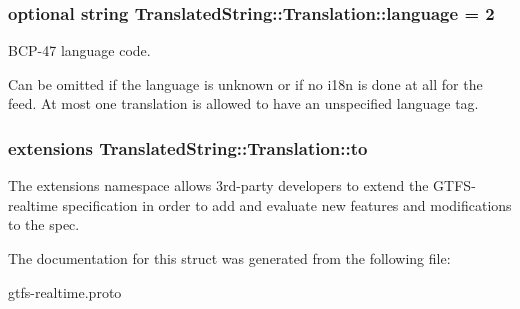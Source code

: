 \subsubsection[{\texorpdfstring{language}{language}}]{\setlength{\rightskip}{0pt plus 5cm}optional string Translated\+String\+::\+Translation\+::language = 2}\hypertarget{structTranslatedString_1_1Translation_a6e5c700cec22dc98de803fb6b645a657}{}\label{structTranslatedString_1_1Translation_a6e5c700cec22dc98de803fb6b645a657}


B\+C\+P-\/47 language code. 

Can be omitted if the language is unknown or if no i18n is done at all for the feed. At most one translation is allowed to have an unspecified language tag. 
\subsubsection[{\texorpdfstring{to}{to}}]{\setlength{\rightskip}{0pt plus 5cm}extensions Translated\+String\+::\+Translation\+::to}\hypertarget{structTranslatedString_1_1Translation_af612df22186e21e2472a5c6fcde687eb}{}\label{structTranslatedString_1_1Translation_af612df22186e21e2472a5c6fcde687eb}


The extensions namespace allows 3rd-\/party developers to extend the G\+T\+F\+S-\/realtime specification in order to add and evaluate new features and modifications to the spec. 



The documentation for this struct was generated from the following file\+:\begin{DoxyCompactItemize}
\item 
gtfs-\/realtime.\+proto\end{DoxyCompactItemize}
